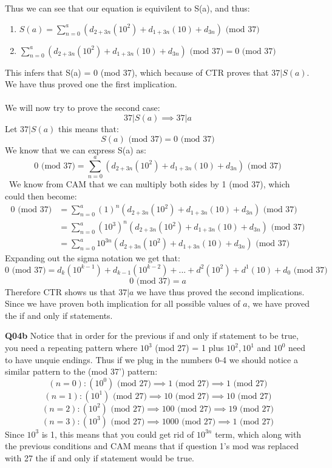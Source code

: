 \documentclass[11pt]{article}
\begin{document}
Thus we can see that our equation is equivilent to S(a), and thus:
\begin{enumerate}
\item $  S(a) = \sum\limits_{n = 0}^a  (d_{2+3n}(10^2) + d_{1+3n}(10) +d_{3n})  \text{ (mod 37)} $
\item $  \sum\limits_{n = 0}^a  (d_{2+3n}(10^2) + d_{1+3n}(10) +d_{3n})  \text{ (mod 37)} = 0 \text{ (mod 37)}  $
\end{enumerate}
This infers that S(a) = 0 (mod 37), which because of CTR proves that $37|S(a)$. We have thus proved one the first implication.\\\\
We will now try to prove the second case:
\[ 37|S(a) \implies 37|a \]
Let $37|S(a)$ this means that:
\[ S(a) \text{ (mod 37)} = 0  \text{ (mod 37)} \]
We know that we can express S(a) as:
 \[ 0 \text{ (mod 37)} = \sum\limits_{n = 0}^a  (d_{2+3n}(10^2) + d_{1+3n}(10) +d_{3n})  \text{ (mod 37)} \]\
We know from CAM that we can multiply both sides by 1 (mod 37), which could then become:
\begin{align*}
0 \text{ (mod 37)} & = \sum\limits_{n = 0}^a (1)^n (d_{2+3n}(10^2) + d_{1+3n}(10) +d_{3n})  \text{ (mod 37)}   \\
& = \sum\limits_{n = 0}^a (10^3)^n (d_{2+3n}(10^2) + d_{1+3n}(10) +d_{3n})  \text{ (mod 37)}   \\
& =  \sum\limits_{n = 0}^a 10^{3n} (d_{2+3n}(10^2) + d_{1+3n}(10) +d_{3n})  \text{ (mod 37)}   
\end{align*}
Expanding out the sigma notation we get that:
\[ 0 \text{ (mod 37)} = d_k(10^{k-1}) + d_{k-1}(10^{k-2}) + ... + d^2(10^2) + d^1(10) +d_0 \text{ (mod 37)}  \]
\[ 0 \text{ (mod 37)} = a  \]
Therefore CTR shows us that $37|a$ we have thus proved the second implications. Since we have proven both implication for all possible values of $a$, we have proved the if and only if statements.

\textbf{Q04b} Notice that in order for the previous if and only if statement to be true, you need a repeating pattern where $10^3$ (mod 27) = 1 plus $10^2, 10^1$ and $10^0$ need to have unquie endings. Thus if we plug in the numbers 0-4 we should notice a similar pattern to the (mod 37') pattern:
\[ (n = 0): (10^{0}) \text{ (mod 27)} \implies 1 \text{ (mod 27)} \implies 1 \text{ (mod 27)}  \]
\[ (n = 1): (10^{1}) \text{ (mod 27)} \implies 10 \text{ (mod 27)} \implies 10 \text{ (mod 27)}  \]
\[ (n = 2): (10^{2}) \text{ (mod 27)} \implies 100 \text{ (mod 27)} \implies 19 \text{ (mod 27)} \]
\[ (n = 3): (10^{3}) \text{ (mod 27)} \implies 1000 \text{ (mod 27)} \implies 1 \text{ (mod 27)} \]
Since $10^3$ is 1, this means that you could get rid of $10^{3n}$ term, which along with the previous conditions and CAM means that if question 1's mod was replaced with 27 the if and only if statement would be true. 
\end{document}
